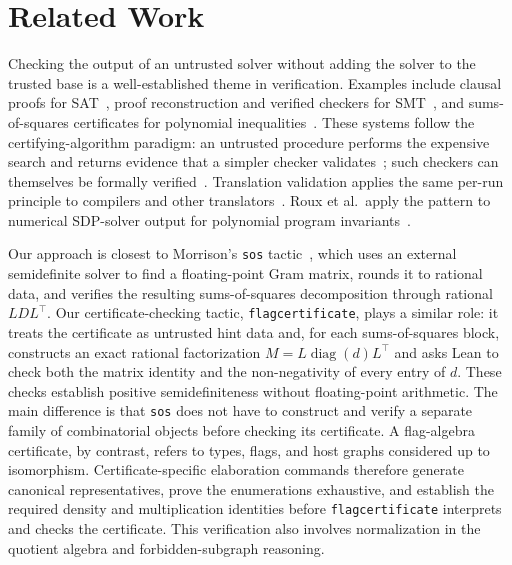 \documentclass[acmsmall,screen=true,acmthm=false]{acmart}
\newcommand{\boldparagraph}[1]{\noindentparagraph{\textnormal{\textbf{#1}}}}
\DeclareRobustCommand{\lean}[1]{{\def\_{\textunderscore\allowbreak}\texttt{#1}}}
\begin{document}
\section{Related Work}
\label{sec:related}

\boldparagraph{Certificate checking and proof reconstruction.}
Checking the output of an untrusted solver without adding the solver to the
trusted base is a well-established theme in verification.  Examples include
clausal proofs for SAT~\cite{lammich2020unsat,tan2023cakelpr}, proof
reconstruction and verified checkers for
SMT~\cite{bohme2010z3,armand2011modular}, and sums-of-squares certificates for
polynomial
inequalities~\cite{harrison2007verifying,besson2006fast,morrison2026sos}.
These systems follow the certifying-algorithm paradigm: an untrusted procedure
performs the expensive search and returns evidence that a simpler checker
validates~\cite{mcconnell2011certifying}; such checkers can themselves be
formally verified~\cite{alkassar2014framework}.  Translation validation applies
the same per-run principle to compilers and other
translators~\cite{pnueli1998translation}.  Roux et al.\ apply the pattern to
numerical SDP-solver output for polynomial program
invariants~\cite{roux2018validating}.

Our approach is closest to Morrison's \lean{sos}
tactic~\cite{morrison2026sos}, which uses an external semidefinite solver to
find a floating-point Gram matrix, rounds it to rational data, and verifies the
resulting sums-of-squares decomposition through rational $LDL^\top$.  Our
certificate-checking tactic, \lean{flag\_certificate}, plays a similar role: it
treats the certificate as untrusted hint data and, for each sums-of-squares
block, constructs an exact rational factorization
$M=L\operatorname{diag}(d)L^\top$
and asks Lean to check both the matrix identity and the non-negativity of every
entry of $d$.  These checks establish positive semidefiniteness without
floating-point arithmetic.  The main difference is that \lean{sos} does not
have to construct and verify a separate family of combinatorial objects before
checking its certificate.  A flag-algebra certificate, by contrast, refers to
types, flags, and host graphs considered up to isomorphism.
Certificate-specific elaboration commands therefore generate canonical
representatives, prove the enumerations exhaustive, and establish the required
density and multiplication identities before \lean{flag\_certificate}
interprets and checks the certificate.  This verification also involves
normalization in the quotient algebra and forbidden-subgraph reasoning.
\end{document}
